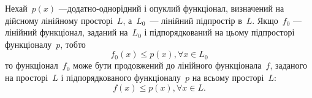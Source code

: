 \begin{theorem}
Нехай~$p(x)$ ---додатно-однорідний
і опуклий функціонал, визначений на дійсному лінійному
просторі~$L$, а~$L_0$~--- лінійний підпростір в~$L$. Якщо~$f_0$ ---
лінійний функціонал, заданий на~$L_0$ і підпорядкований на
цьому підпросторі функціоналу~$p$, тобто
\begin{equation}
    \label{eq:9.1}
    f_0(x) \le p(x), \forall x \in L_0
\end{equation}
то функціонал~$f_0$ може бути продовжений до лінійного
функціонала~$f$, заданого на просторі~$L$ і підпорядкованого
функціоналу~$p$ на всьому просторі~$L$:
\begin{equation}
    \label{eq:9.2}
    f(x) \le p(x), \forall x \in L.
\end{equation}
\end{theorem}

